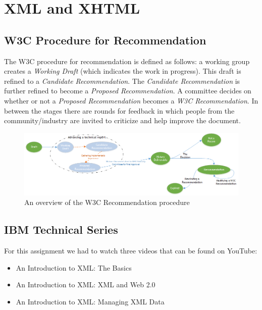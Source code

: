 
\section{XML and XHTML}

\subsection{W3C Procedure for Recommendation}

The W3C procedure for recommendation is defined as follows: a working group creates a \textit{Working Draft} (which indicates the work in progress). This draft is refined to a \textit{Candidate Recommendation}. The \textit{Candidate Recommendation} is further refined to become a \textit{Proposed Recommendation}. A committee decides on whether or not a \textit{Proposed Recommendation} becomes a \textit{W3C Recommendation}. In between the stages there are rounds for feedback in which people from the community/industry are invited to criticize and help improve the document.

\vspace{10pt}

\begin{figure}[here]
	\centering
	\includegraphics[width=1.0\textwidth]{images/w3c.png}
	\caption{An overview of the W3C Recommendation procedure}
	\label{fig:RecommendationProcedure}
\end{figure}

\subsection{IBM Technical Series}

For this assignment we had to watch three videos that can be found on YouTube:
\begin{itemize}
\item An Introduction to XML: The Basics \citep{ibmtechnicalpart1}
\item An Introduction to XML: XML and Web 2.0 \citep{ibmtechnicalpart2}
\item An Introduction to XML: Managing XML Data \citep{ibmtechnicalpart3}
\end{itemize}


